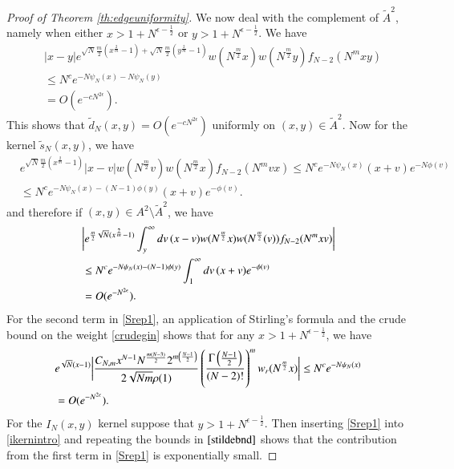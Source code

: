 \documentclass[11pt,reqno]{amsproc}
\numberwithin{equation}{section}
\numberwithin{theorem}{section}
\begin{document}
\begin{proof}[Proof of Theorem \ref{th:edgeuniformity}]
We now deal with the complement of $\tilde{A}^{2}$, namely when either $x > 1+N^{\epsilon-\frac{1}{2}}$ or $y > 1+N^{\epsilon-\frac{1}{2}}$. We have
\begin{equation}
\begin{split}
&|x-y|e^{\sqrt{N}\frac{m}{2}(x^{\frac{2}{m}}-1)+\sqrt{N}\frac{m}{2}(y^{\frac{2}{m}}-1)}w(N^{\frac{m}{2}}x)w(N^{\frac{m}{2}}y)f_{N-2}(N^{m}xy)\\
&\leq N^{c}e^{-N\psi_{N}(x)-N\psi_{N}(y)}\\
&= O(e^{-cN^{2\epsilon}}).
\end{split}
\end{equation} 
This shows that $\tilde{d}_{N}(x,y) = O(e^{-cN^{2\epsilon}})$ uniformly on $(x,y) \in \tilde{A}^{2}$. Now for the kernel $\tilde{s}_{N}(x,y)$, we have
\begin{align}
&e^{\sqrt{N}\frac{m}{2}(x^{\frac{2}{m}}-1)}|x-v|w(N^{\frac{m}{2}}v)w(N^{\frac{m}{2}}x)f_{N-2}(N^{m}vx) \leq N^{c}e^{-N\psi_{N}(x)}(x+v)e^{-N\phi(v)}\\
&\leq N^{c}e^{-N\psi_{N}(x)-(N-1)\phi(y)}(x+v)e^{-\phi(v)}.
\end{align}
and therefore if $(x,y) \in A^{2}\setminus\tilde{A}^{2}$, we have
\begin{equation}
\begin{split}
&\bigg{|}e^{\frac{m}{2}\sqrt{N}(x^{\frac{2}{m}}-1)}\int_{y}^{\infty}dv\,(x-v)w(N^{\frac{m}{2}}x)w(N^{\frac{m}{2}}(v))f_{N-2}(N^{m}xv)\bigg{|}\\
&\leq N^{c}e^{-N\psi_{N}(x)-(N-1)\phi(y)}\int_{1}^{\infty}dv\,(x+v)e^{-\phi(v)}\label{stildebnd}\\
&=O(e^{-N^{2\epsilon}}).
\end{split} 
\end{equation}
For the second term in \eqref{Srep1}, an application of Stirling's formula and the crude bound on the weight \eqref{crudegin} shows that for any $x > 1+N^{\epsilon-\frac{1}{2}}$, we have
\begin{equation}
\begin{split}
&e^{\sqrt{N}(x-1)}\bigg{|}\frac{C_{N,m}x^{N-1}N^{\frac{m(N-3)}{2}}2^{m\left(\frac{N-1}{2}\right)}}{2\sqrt{Nm}\rho(1)}\left(\frac{\Gamma\left(\frac{N-1}{2}\right)}{(N-2)!}\right)^{m}w_{r}(N^{\frac{m}{2}}x)\bigg{|} \leq N^{c}e^{-N\psi_{N}(x)}\\
&=O(e^{-N^{2\epsilon}}).
\end{split}
\end{equation}
For the $I_{N}(x,y)$ kernel suppose that $y>1+N^{\epsilon-\frac{1}{2}}$. Then inserting \eqref{Srep1} into \eqref{ikernintro} and repeating the bounds in $\eqref{stildebnd}$ shows that the contribution from the first term in \eqref{Srep1} is exponentially small. 

\end{proof}
\end{document}
